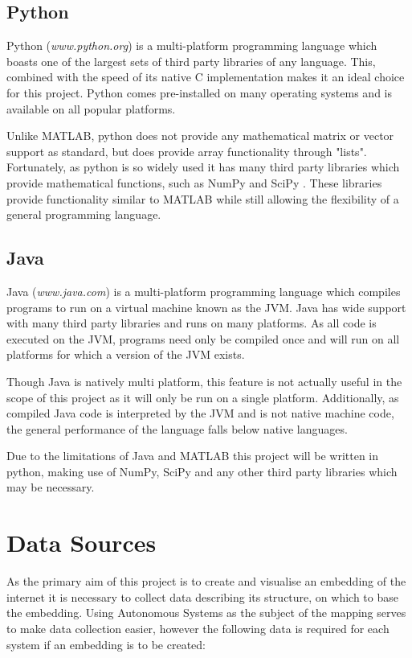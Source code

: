 \subsection{Python}
Python (\textit{www.python.org}) is a multi-platform programming language which boasts one of the largest sets of third party libraries of any language. This, combined with the speed of its native C implementation makes it an ideal choice for this project. Python comes pre-installed on many operating systems and is available on all popular platforms.

Unlike MATLAB, python does not provide any mathematical matrix or vector support as standard, but does provide array functionality through "lists". Fortunately, as python is so widely used it has many third party libraries which provide mathematical functions, such as NumPy \cite{python_numpy_2015} and SciPy \cite{jones_scipy:_2001}. These libraries provide functionality similar to MATLAB while still allowing the flexibility of a general programming language.

\subsection{Java}
Java (\textit{www.java.com}) is a multi-platform programming language which compiles programs to run on a virtual machine known as the JVM. Java has wide support with many third party libraries and runs on many platforms. As all code is executed on the JVM, programs need only be compiled once and will run on all platforms for which a version of the JVM exists. 

Though Java is natively multi platform, this feature is not actually useful in the scope of this project as it will only be run on a single platform. Additionally, as compiled Java code is interpreted by the JVM and is not native machine code, the general performance of the language falls below native languages.

Due to the limitations of Java and MATLAB this project will be written in python, making use of NumPy, SciPy and any other third party libraries which may be necessary.

\section{Data Sources}
\label{sec:DesignDataSources}
As the primary aim of this project is to create and visualise an embedding of the internet it is necessary to collect data describing its structure, on which to base the embedding. Using Autonomous Systems as the subject of the mapping serves to make data collection easier, however the following data is required for each system if an embedding is to be created:

